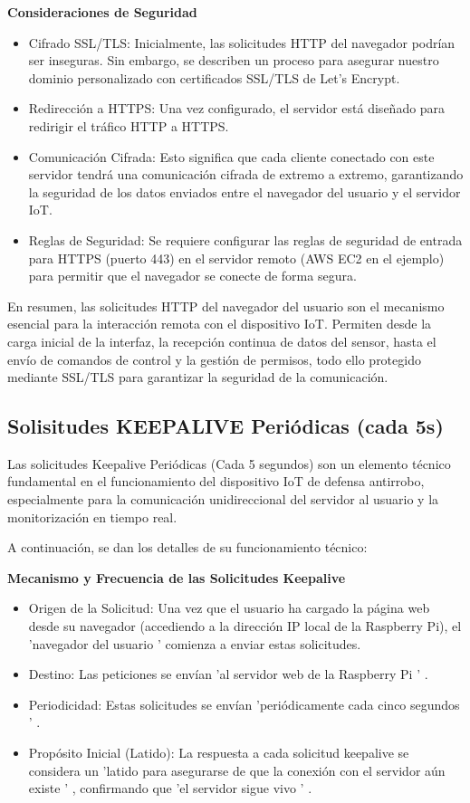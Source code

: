 \documentclass{report}
\begin{document}
\textbf{Consideraciones de Seguridad}
\begin{itemize}
    \item Cifrado SSL/TLS: Inicialmente, las solicitudes HTTP del navegador podrían ser inseguras. Sin embargo, se  describen un proceso para 
    asegurar nuestro dominio personalizado con certificados SSL/TLS de Let's Encrypt.
    \item Redirección a HTTPS: Una vez configurado, el servidor está diseñado para redirigir el tráfico HTTP a HTTPS.
    \item Comunicación Cifrada: Esto significa que cada cliente conectado con este servidor tendrá una comunicación cifrada de extremo a extremo, 
    garantizando la seguridad de los datos enviados entre el navegador del usuario y el servidor IoT.
    \item Reglas de Seguridad: Se requiere configurar las reglas de seguridad de entrada para HTTPS (puerto 443) en el servidor remoto 
    (AWS EC2 en el ejemplo) para permitir que el navegador se conecte de forma segura.
\end{itemize}

En resumen, las solicitudes HTTP del navegador del usuario son el mecanismo esencial para la interacción remota con el dispositivo IoT. 
Permiten desde la carga inicial de la interfaz, la recepción continua de datos del sensor, hasta el envío de comandos de control y la gestión 
de permisos, todo ello protegido mediante SSL/TLS para garantizar la seguridad de la comunicación.

\subsection{Solisitudes KEEPALIVE Periódicas (cada 5s)}
Las solicitudes Keepalive Periódicas (Cada 5 segundos) son un elemento técnico fundamental en el funcionamiento del dispositivo IoT de defensa antirrobo, 
especialmente para la comunicación unidireccional del servidor al usuario y la monitorización en tiempo real.

A continuación, se dan los detalles de su funcionamiento técnico:

\textbf{Mecanismo y Frecuencia de las Solicitudes Keepalive}
\begin{itemize}
    \item Origen de la Solicitud:  Una vez que el usuario ha cargado la página web desde su navegador (accediendo a la dirección IP local de la Raspberry Pi), 
    el 'navegador del usuario '  comienza a enviar estas solicitudes.
    \item Destino:  Las peticiones se envían   'al servidor web de la Raspberry Pi ' .
    \item Periodicidad:  Estas solicitudes se envían   'periódicamente cada cinco segundos ' .
    \item Propósito Inicial (Latido):  La respuesta a cada solicitud keepalive se considera un   'latido para asegurarse de que la conexión con el servidor 
    aún existe ' , confirmando que   'el servidor sigue vivo ' .
\end{itemize}
\end{document}
